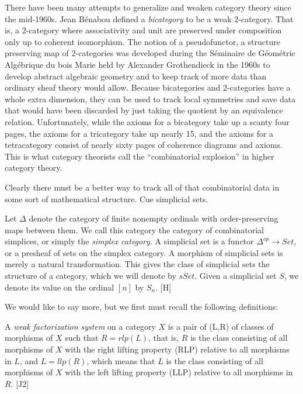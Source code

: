 \documentclass{amsart}
\begin{document}
There have been many attempts to generalize and weaken category theory since the mid-1960s.  Jean B\'enabou defined a \emph{bicategory} to be a weak $2$-category. That is, a $2$-category where associativity and unit are preserved under composition only up to coherent isomorphism.  The notion of a pseudofunctor, a structure preserving map of $2$-categories was developed during the S\'eminaire de G\'eom\'etrie Alg\'ebrique du bois Marie held by Alexander Grothendieck in the 1960s to develop abstract algebraic geometry and to keep track of more data than ordinary sheaf theory would allow.  Because bicategories and 2-categories have a whole extra dimension, they can be used to track local symmetries and save data that would have been discarded by just taking the quotient by an equivalence relation.  Unfortunately, while the axioms for a bicategory take up a scanty four pages, the axioms for a tricategory take up nearly 15, and the axioms for a tetracategory consist of nearly sixty pages of coherence diagrams and axioms.  This is what category theorists call the ``combinatorial explosion'' in higher category theory.  

Clearly there must be a better way to track all of that combinatorial data in some sort of mathematical structure.  Cue simplicial sets.

\begin{defn}
Let $\Delta$ denote the category of finite nonempty ordinals with order-preserving maps between them. We call this category the category of combinatorial simplices, or simply the \emph{simplex category}. A simplicial set is a functor $\Delta^{op}\to Set$, or a presheaf of sets on the simplex category.  A morphism of simplicial sets is merely a natural transformation.  This gives the class of simplicial sets the structure of a category, which we will denote by $sSet$.  Given a simplicial set $S$, we denote its value on the ordinal $[n]$ by $S_n$.  [H]
\end{defn}

We would like to say more, but we first must recall the following definitions:

\begin{defn}
A \emph{weak factorization system} on a category $X$ is a pair of (L,R) of classes of morphisms of $X$ such that $R=rlp(L)$, that is, $R$ is the class consisting of all morphisms of $X$ with the right lifting property (RLP) relative to all morphisms in $L$, and $L=llp(R)$, which means that $L$ is the class consisting of all morphisms of $X$ with the left lifting property (LLP) relative to all morphisms in $R$.  [J2]
\end{defn}
\end{document}
